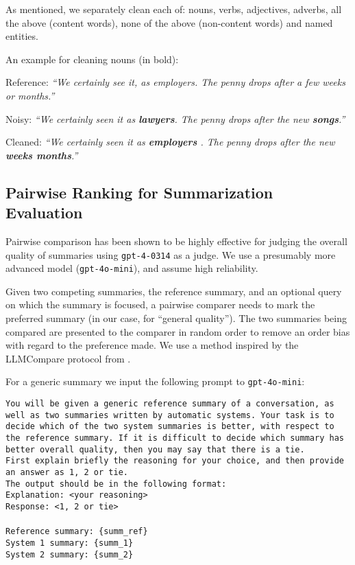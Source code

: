 As mentioned, we separately clean each of: nouns, verbs, adjectives, adverbs, all the above (content words), none of the above (non-content words) and named entities.

An example for cleaning nouns (in bold):

\noindent
Reference: \textit{``We certainly see it, as employers. The penny drops after a few weeks or months.''}

\noindent
Noisy: \textit{``We certainly seen it as \textbf{lawyers}. The penny drops after the new \textbf{songs}.''}

\noindent
Cleaned: \textit{``We certainly seen it as \textbf{employers} . The penny drops after the new \textbf{weeks months}.''}


\subsection{Pairwise Ranking for Summarization Evaluation}
\label{sec_appendix_implementation_pairwise}

Pairwise comparison has been shown to be highly effective for judging the overall quality of summaries \citep{liu-etal-2024-benchmarking} using \texttt{gpt-4-0314} as a judge. We use a presumably more advanced model (\texttt{gpt-4o-mini}), and assume high reliability.

Given two competing summaries, the reference summary, and an optional query on which the summary is focused, a pairwise comparer needs to mark the preferred summary (in our case, for ``general quality''). The two summaries being compared are presented to the comparer in random order to remove an order bias with regard to the preference made. We use a method inspired by the LLMCompare protocol from \citet{liu-etal-2024-benchmarking}.

For a generic summary we input the following prompt to \texttt{gpt-4o-mini}:

\begin{tcolorbox}[colback=gray!10, colframe=gray!50, sharp corners, boxrule=0.5mm]
\small{
\texttt{You will be given a generic reference summary of a conversation, as well as two summaries written by automatic systems. Your task is to decide which of the two system summaries is better, with respect to the reference summary. If it is difficult to decide which summary has better overall quality, then you may say that there is a tie. \\
First explain briefly the reasoning for your choice, and then provide an answer as 1, 2 or tie. \\
The output should be in the following format:\\
Explanation: <your reasoning>\\
Response: <1, 2 or tie>\\\\
Reference summary: \{summ\_ref\}\\
System 1 summary: \{summ\_1\}\\
System 2 summary: \{summ\_2\}}}
\end{tcolorbox}

